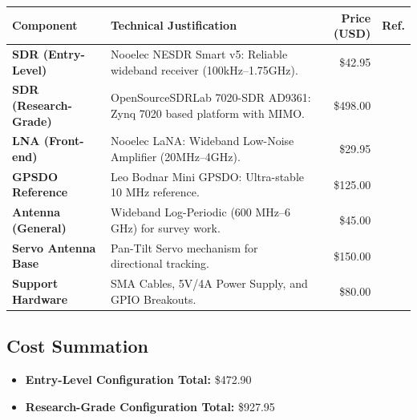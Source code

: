 \documentclass{article}
\begin{document}
\begin{table}[h]
\centering
\small
\begin{tabular}{@{}p{3.5cm}p{6cm}rr@{}}
\toprule
\textbf{Component} & \textbf{Technical Justification} & \textbf{Price (USD)} & \textbf{Ref.} \\ \midrule

\textbf{SDR (Entry-Level)} &
Nooelec NESDR Smart v5: Reliable wideband receiver (100kHz–1.75GHz). &
\$42.95 &
\\

\textbf{SDR (Research-Grade)} &
OpenSourceSDRLab 7020-SDR AD9361: Zynq 7020 based platform with MIMO. &
\$498.00 &
\\

\textbf{LNA (Front-end)} &
Nooelec LaNA: Wideband Low-Noise Amplifier (20MHz–4GHz). &
\$29.95 &
\\

\textbf{GPSDO Reference} &
Leo Bodnar Mini GPSDO: Ultra-stable 10 MHz reference. &
\$125.00 &
\\

\textbf{Antenna (General)} &
Wideband Log-Periodic (600 MHz–6 GHz) for survey work. &
\$45.00 &
\\

\textbf{Servo Antenna Base} &
Pan-Tilt Servo mechanism for directional tracking. &
\$150.00 &
\\

\textbf{Support Hardware} &
SMA Cables, 5V/4A Power Supply, and GPIO Breakouts. &
\$80.00 &
\\

\bottomrule
\end{tabular}
\end{table}

\subsection{Cost Summation}
\begin{itemize}
    \item \textbf{Entry-Level Configuration Total:} \$472.90
    \item \textbf{Research-Grade Configuration Total:} \$927.95
\end{itemize}
\end{document}
